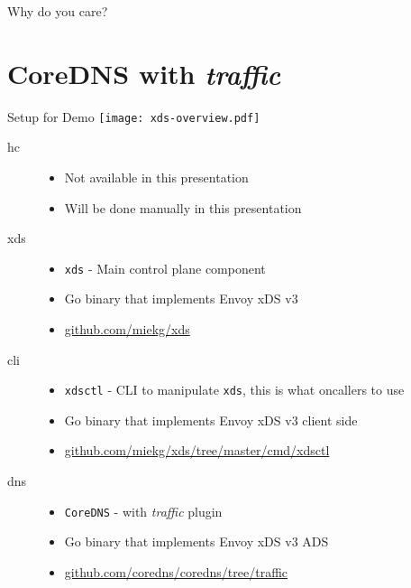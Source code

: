 \documentclass[aspectratio=169]{beamer}
\begin{document}
    \begin{frame}{Why do you care?}

    \end{frame}

    \section{CoreDNS with \emph{traffic}}

    \begin{frame}{Setup for Demo}
            \texttt{[image: xds-overview.pdf]}
    \end{frame}

    \begin{frame}{}
        \begin{description}
            \item[hc]
                \begin{itemize}
                    \item Not available in this presentation
                    \item Will be done manually in this presentation
                \end{itemize}
            \item[xds]
                \begin{itemize}
                    \item \texttt{xds} - Main control plane component
                    \item Go binary that implements Envoy xDS v3
                    \item \url{github.com/miekg/xds}
                \end{itemize}
            \item[cli]
                \begin{itemize}
                    \item \texttt{xdsctl} - CLI to manipulate \texttt{xds}, this is what oncallers to use
                    \item Go binary that implements Envoy xDS v3 client side
                    \item \url{github.com/miekg/xds/tree/master/cmd/xdsctl}
                \end{itemize}
            \item[dns]
                \begin{itemize}
                    \item \texttt{CoreDNS} - with \emph{traffic} plugin
                    \item Go binary that implements Envoy xDS v3 ADS
                    \item \url{github.com/coredns/coredns/tree/traffic}
                \end{itemize}
        \end{description}
    \end{frame}
\end{document}
